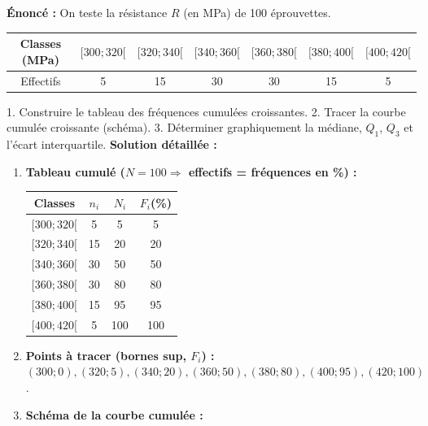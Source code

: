 \documentclass[11pt]{article}
\begin{document}
\begin{exoresolu}
    \textbf{Énoncé :} On teste la résistance $R$ (en MPa) de 100 éprouvettes.
    \begin{center}
    \begin{tabular}{|c|c|c|c|c|c|c|}\hline
    \rowcolor{popblueL} Classes (MPa) & $[300;320[$ & $[320;340[$ & $[340;360[$ & $[360;380[$ & $[380;400[$ & $[400;420[$ \\ \hline
    Effectifs & 5 & 15 & 30 & 30 & 15 & 5 \\ \hline
    \end{tabular}
    \end{center}
    1. Construire le tableau des fréquences cumulées croissantes. 2. Tracer la courbe cumulée croissante (schéma). 3. Déterminer graphiquement la médiane, $Q_1$, $Q_3$ et l'écart interquartile.
    \tcblower
    \textbf{Solution détaillée :}
    \begin{enumerate}
        \item \textbf{Tableau cumulé ($N=100 \Rightarrow$ effectifs = fréquences en \%) :}
        \begin{center}
        \begin{tabular}{|c|c|c|c|}\hline
        \rowcolor{popblueL} Classes & $n_i$ & $N_i$ & $F_i$(\%) \\ \hline
        $[300;320[$ & 5 & 5 & 5 \\ \hline
        $[320;340[$ & 15 & 20 & 20 \\ \hline
        $[340;360[$ & 30 & 50 & 50 \\ \hline
        $[360;380[$ & 30 & 80 & 80 \\ \hline
        $[380;400[$ & 15 & 95 & 95 \\ \hline
        $[400;420[$ & 5 & 100 & 100 \\ \hline
        \end{tabular}
        \end{center}
        \item \textbf{Points à tracer (bornes sup, $F_i$) :} $(300;0), (320;5), (340;20), (360;50), (380;80), (400;95), (420;100)$.
        \item \textbf{Schéma de la courbe cumulée :}
        \begin{popfigure}
\end{popfigure}
\end{enumerate}
\end{exoresolu}
\end{document}
